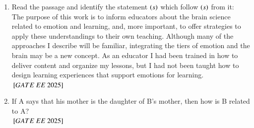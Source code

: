 \documentclass[journal,12pt,onecolumn]{IEEEtran}
\theoremstyle{remark}
\begin{document}
\begin{enumerate}
   \item Read the passage and identify the statement $\left(s\right)$ which follow $\left(s\right)$ from it: \\    
      The purpose of this work is to inform educators about the brain science related to emotion and learning, and, more important, to offer strategies to apply these understandings to their own teaching. Although many of the approaches I describe will be familiar, integrating the tiers of emotion and the brain may be a new concept. As an educator I had been trained in how to deliver content and organize my lessons, but I had not been taught how to design learning experiences that support emotions for learning. \\     
     \hfill ${}\left[GATE\ EE\ 2025\right]$
    \begin{enumerate}
       \end{enumerate}

   \item If A says that his mother is the daughter of B's mother, then how is B related to A? \\    
    \hfill ${}\left[GATE\ EE\ 2025\right]$
    \begin{enumerate}
       \end{enumerate}


\end{enumerate}
\end{document}
